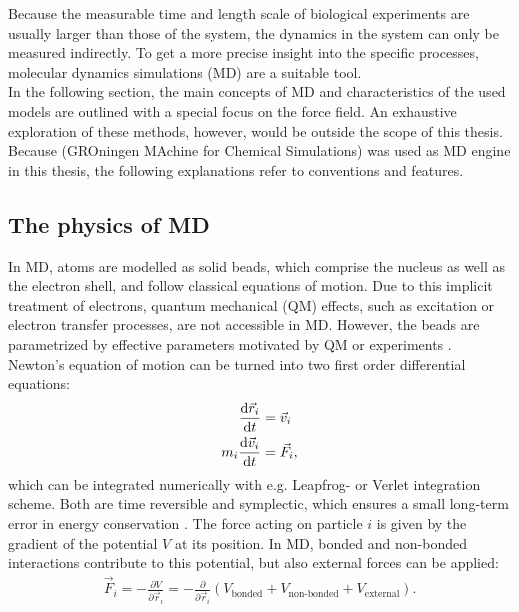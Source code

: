 Because the measurable time and length scale of biological experiments are usually larger than those of the system, the dynamics in the system can only be measured indirectly. To get a more precise insight into the specific processes, molecular dynamics simulations (MD) are a suitable tool.\\
In the following section, the main concepts of MD and characteristics of the used models are outlined with a special focus on the \martini{} force field. An exhaustive exploration of these methods, however, would be outside the scope of this thesis. Because \gromacs{} (GROningen MAchine for Chemical Simulations) \autocites{gromacs1, gromacsManual} was used as MD engine in this thesis, the following explanations refer to \gromacs{} conventions and features. 
\subsection{The physics of MD}
In MD, atoms are modelled as solid beads, which comprise the nucleus as well as the electron shell, and follow classical equations of motion. Due to this implicit treatment of electrons, quantum mechanical (QM) effects, such as excitation or electron transfer processes, are not accessible in MD. However, the beads are parametrized by effective parameters motivated by QM or experiments \autocite[p. 127-128]{greenBook}.\\
Newton's equation of motion can be turned into two first order differential equations:
\begin{align}
	\label{eq:eq_of_mot_first_order}
	\frac{\text{d} \vec{r}_i}{\text{d} t} &= \vec{v}_i \\
	m_i \frac{\text{d} \vec{v}_i}{\text{d} t} &= \vec{F}_{i},
\end{align}
which can be integrated numerically with e.g. Leapfrog- or Verlet integration scheme. Both are time reversible and symplectic, which ensures a small long-term error in energy conservation \autocite[p. 72-74]{UnderstandingMD}. The force acting on particle $i$ is given by the gradient of the potential $V$ at its position. In MD, bonded and non-bonded interactions contribute to this potential, but also external forces can be applied:
\begin{align}
	\vec{F}_i = - \frac{\partial V}{\partial \vec{r}_i} = - \frac{\partial}{\partial \vec{r}_i} \left(V_\text{bonded} + V_\text{non-bonded} + V_\text{external}\right).
\end{align}

